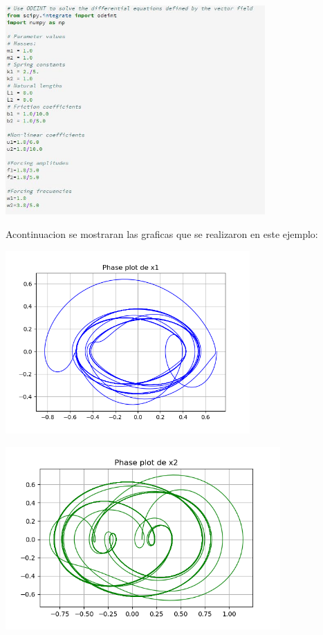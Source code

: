 \documentclass{article}
\begin{document}
\begin{center}
\includegraphics[height=8cm]{cod11.png}
\end{center}


Acontinuacion se mostraran las graficas que se realizaron en este ejemplo:

\begin{center}
\includegraphics[height=7cm]{nolineal4_1_1.png}
\end{center}

\begin{center}
\includegraphics[height=7cm]{nolineal4_1_2.png}
\end{center}
\end{document}
